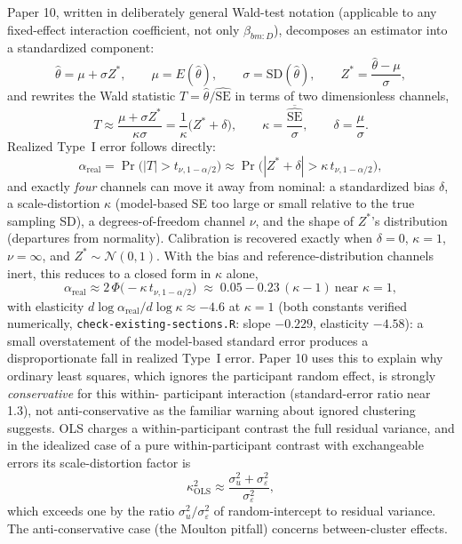 \documentclass[11pt]{article}
\newcommand{\code}[1]{\texttt{#1}}
\begin{document}
Paper 10, written in deliberately general Wald-test notation
(applicable to any fixed-effect interaction coefficient, not only
$\beta_{bm:D}$), decomposes an estimator into a standardized component:
\begin{equation}
\hat\theta = \mu + \sigma Z^\ast, \qquad \mu = E(\hat\theta), \qquad
  \sigma = \mathrm{SD}(\hat\theta), \qquad Z^\ast =
  \frac{\hat\theta - \mu}{\sigma},
\label{eq:theta-decomp}
\end{equation}
and rewrites the Wald statistic $T = \hat\theta/\widehat{\mathrm{SE}}$
in terms of two dimensionless channels,
\begin{equation}
T \approx \frac{\mu + \sigma Z^\ast}{\kappa\sigma} =
  \frac{1}{\kappa}\big(Z^\ast + \delta\big), \qquad
  \kappa = \frac{\overline{\widehat{\mathrm{SE}}}}{\sigma}, \qquad
  \delta = \frac{\mu}{\sigma}.
\label{eq:theta-wald}
\end{equation}
Realized Type~I error follows directly:
\begin{equation}
\alpha_{\mathrm{real}} = \Pr\big(|T| > t_{\nu,1-\alpha/2}\big) \approx
  \Pr\big(|Z^\ast + \delta| > \kappa\, t_{\nu,1-\alpha/2}\big),
\label{eq:theta-alpha}
\end{equation}
and exactly \emph{four} channels can move it away from nominal: a
standardized bias $\delta$, a scale-distortion $\kappa$ (model-based
SE too large or small relative to the true sampling SD), a
degrees-of-freedom channel $\nu$, and the shape of $Z^\ast$'s
distribution (departures from normality). Calibration is recovered
exactly when $\delta=0$, $\kappa=1$, $\nu=\infty$, and $Z^\ast\sim
\mathcal N(0,1)$. With the bias and reference-distribution channels inert, this
reduces to a closed form in $\kappa$ alone,
\begin{equation}
\alpha_{\mathrm{real}} \approx 2\,\Phi\big(-\kappa\, t_{\nu,1-\alpha/2}\big)
  \;\approx\; 0.05 - 0.23\,(\kappa - 1) \ \text{near } \kappa=1,
\label{eq:theta-closed}
\end{equation}
with elasticity $d\log\alpha_{\mathrm{real}}/d\log\kappa \approx -4.6$
at $\kappa=1$ (both constants verified numerically,
\code{check-existing-sections.R}: slope $-0.229$, elasticity $-4.58$): a small
overstatement of the model-based standard error produces a
disproportionate fall in realized Type~I error. Paper 10 uses this to
explain why ordinary least squares, which ignores the participant
random effect, is strongly \emph{conservative} for this within-
participant interaction (standard-error ratio near 1.3), not
anti-conservative as the familiar warning about ignored clustering
suggests. OLS charges a within-participant contrast the full residual
variance, and in the idealized case of a pure within-participant
contrast with exchangeable errors its scale-distortion factor is
\begin{equation}
\kappa_{\mathrm{OLS}}^2 \approx \frac{\sigma_u^2 +
  \sigma_\varepsilon^2}{\sigma_\varepsilon^2},
\label{eq:kappa-ols}
\end{equation}
which exceeds one by the ratio $\sigma_u^2/\sigma_\varepsilon^2$ of
random-intercept to residual variance. The anti-conservative case
(the Moulton pitfall) concerns between-cluster effects.
\end{document}
